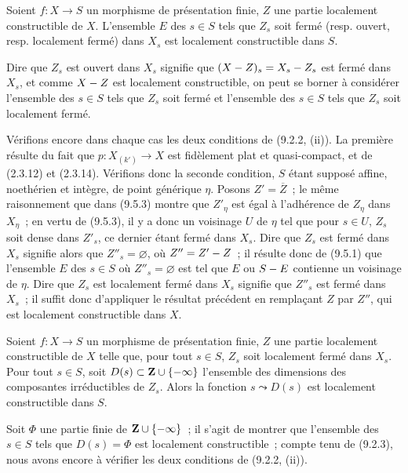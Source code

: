 \begin{corollary}[9.5.4]
\label{IV.9.5.4-fr}
Soient $f:X\to S$ un morphisme de présentation finie, $Z$ une partie
localement constructible de $X$. L'ensemble $E$ des $s\in S$ tels que $Z_s$
soit fermé \textnormal{(resp.} ouvert, \textup{resp.} localement fermé\textnormal{)}
dans $X_s$ est localement constructible dans $S$.
\end{corollary}

Dire que $Z_s$ est ouvert dans $X_s$ signifie que
$(X- Z)_s=X_s- Z_s$ est fermé dans $X_s$, et comme $X- Z$ est localement
constructible, on peut se borner à considérer l'ensemble des $s\in S$ tels que
$Z_s$ soit fermé et l'ensemble des $s\in S$ tels que $Z_s$ soit localement
fermé.

Vérifions encore dans chaque cas les deux conditions de (9.2.2, (ii)). La
première résulte du fait que $p:X_{(k')}\to X$ est fidèlement plat et
quasi-compact, et de (2.3.12) et (2.3.14). Vérifions donc la seconde condition,
$S$ étant supposé affine, noethérien et intègre, de point générique $\eta$.
Posons $Z'=\overline Z$~; le même raisonnement que dans (9.5.3) montre que
$Z'_\eta$ est égal à l'adhérence de $Z_\eta$ dans $X_\eta$~; en vertu de
(9.5.3), il y a donc un voisinage $U$ de $\eta$ tel que pour $s\in U$, $Z_s$
soit dense dans $Z'_s$, ce dernier étant fermé dans $X_s$. Dire que $Z_s$ est
fermé dans $X_s$ signifie alors que $Z''_s=\varnothing$, où $Z''=Z'- Z$~; il
résulte donc de (9.5.1) que l'ensemble $E$ des $s\in S$ où
$Z''_s=\varnothing$ est tel que $E$ ou $S- E$ contienne un voisinage de
$\eta$. Dire que $Z_s$ est localement fermé dans $X_s$ signifie que $Z''_s$
est fermé dans $X_s$~; il suffit donc d'appliquer le résultat précédent en
remplaçant $Z$ par $Z''$, qui est localement constructible dans $X$.


\begin{proposition}[9.5.5]
\label{IV.9.5.5-fr}
Soient $f:X\to S$ un morphisme de présentation finie, $Z$ une partie
localement constructible de $X$ telle que, pour tout $s\in S$, $Z_s$ soit
localement fermé dans $X_s$. Pour tout $s\in S$, soit
$D(s)\subset\mathbf Z\cup\{-\infty\}$ l'ensemble des dimensions des
composantes irréductibles de $Z_s$. Alors la fonction $s\leadsto D(s)$ est
localement constructible dans $S$.
\end{proposition}

Soit $\Phi$ une partie finie de $\mathbf Z\cup\{-\infty\}$~; il s'agit de
montrer que l'ensemble des $s\in S$ tels que $D(s)=\Phi$ est localement
constructible~; compte tenu de (9.2.3), nous avons encore à vérifier les deux
conditions de (9.2.2, (ii)).

